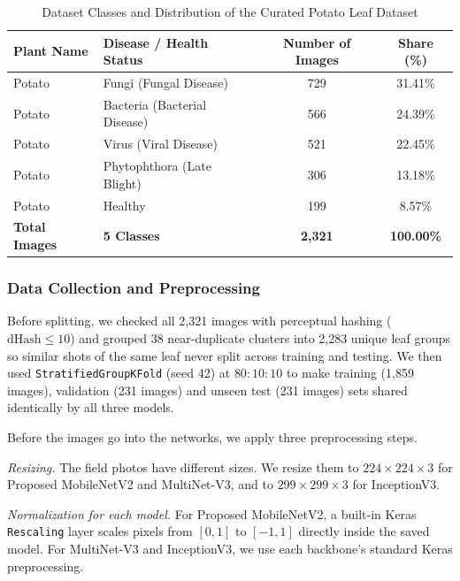 \begin{table}[htbp]
\caption{Dataset Classes and Distribution of the Curated Potato Leaf Dataset}
\label{tab:class_dist}
\begin{center}
\begin{tabularx}{0.9\textwidth}{| X | X | c | c |}
\hline
\textbf{Plant Name} & \textbf{Disease / Health Status} & \textbf{Number of Images} & \textbf{Share (\%)} \\
\hline
Potato & Fungi (Fungal Disease) & 729 & 31.41\% \\
\hline
Potato & Bacteria (Bacterial Disease) & 566 & 24.39\% \\
\hline
Potato & Virus (Viral Disease) & 521 & 22.45\% \\
\hline
Potato & Phytophthora (Late Blight) & 306 & 13.18\% \\
\hline
Potato & Healthy & 199 & 8.57\% \\
\hline
\textbf{Total Images} & \textbf{5 Classes} & \textbf{2,321} & \textbf{100.00\%} \\
\hline
\end{tabularx}
\end{center}
\end{table}

\subsubsection{Data Collection and Preprocessing}
Before splitting, we checked all 2,321 images with perceptual hashing ($\text{dHash} \le 10$) and grouped 38 near-duplicate clusters into 2,283 unique leaf groups so similar shots of the same leaf never split across training and testing. We then used \texttt{StratifiedGroupKFold} (seed 42) at $80:10:10$ to make training (1,859 images), validation (231 images) and unseen test (231 images) sets shared identically by all three models.

Before the images go into the networks, we apply three preprocessing steps.

\textit{Resizing.} The field photos have different sizes. We resize them to $224 \times 224 \times 3$ for Proposed MobileNetV2 and MultiNet-V3, and to $299 \times 299 \times 3$ for InceptionV3.

\textit{Normalization for each model.} For Proposed MobileNetV2, a built-in Keras \texttt{Rescaling} layer scales pixels from $[0, 1]$ to $[-1, 1]$ directly inside the saved model. For MultiNet-V3 and InceptionV3, we use each backbone's standard Keras preprocessing.

